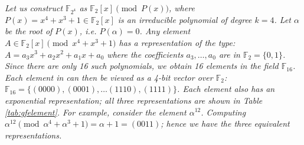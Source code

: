 


\begin{Example}\label{ex:1}
{\it
Let us construct ${\mathbb{F}}_{2^4}$ as ${\mathbb{F}}_2[x] \pmod{
  P(x)}$, where $P(x)=x^4+x^3+1 \in {\mathbb{F}}_2[x]$ is an
irreducible polynomial of degree $k =4$. Let $\alpha$ be the root of
$P(x)$, i.e. $P(\alpha)=0$.  Any element $A \in {\mathbb{F}}_2[x]
\pmod{ x^4 + x^3 + 1}$ has a representation of the type: $A = a_3 x^3
+ a_2 x^2 +  a_1 x + a_0$ where the coefficients $a_3, \dots, a_0$ are
in ${\mathbb{F}}_2 = \{0, 1\}$. Since there are only 16 such
polynomials, we obtain 16 elements in the field
${\mathbb{F}}_{16}$. Each element in can then be viewed as a 4-bit
vector over ${\mathbb{F}}_2$: ${\mathbb{F}}_{16}=\{(0000),(0001),
\dots (1110),(1111)\}$.  Each element also has an exponential
representation; all three representations are shown in Table
\ref{tab:gfelement}. For example, consider the element $\alpha^{12}$.
Computing $\alpha^{12} \pmod{ \alpha^4+\alpha^3+1} = \alpha + 1
= (0011)$; hence we have the three equivalent representations. 
}


\end{Example}
